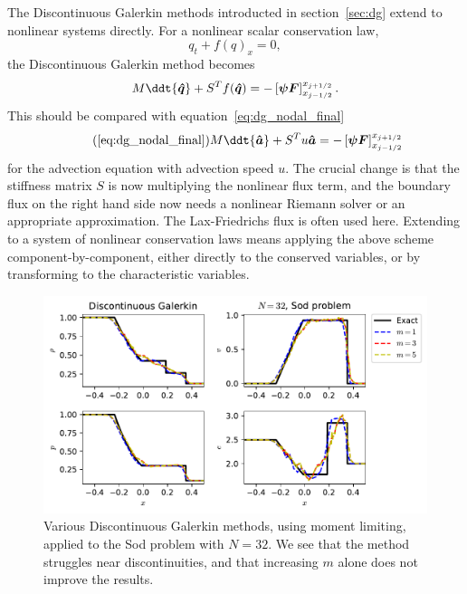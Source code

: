 The Discontinuous Galerkin methods introducted in section~\ref{sec:dg} extend to
nonlinear systems directly. For a nonlinear scalar conservation law,
%
\begin{equation}
  q_t + f(q)_x = 0,
\end{equation}
%
the Discontinuous Galerkin method becomes
%
\begin{equation}
  \label{eq:dg_nodal_scalar_nonlinear}
  M \ddt{\bm{\hat{q}}} + S^T f (\bm{\hat{q}}) = -\left[ \bm{\psi F} \right]_{x_{j-1/2}}^{x_{j+1/2}}.
\end{equation}
%
This should be compared with equation~\eqref{eq:dg_nodal_final}
%
\begin{equation}
  \tag{\ref{eq:dg_nodal_final}}
  M \ddt{\bm{\hat{a}}} + S^T u \bm{\hat{a}} = -\left[ \bm{\psi F} \right]_{x_{j-1/2}}^{x_{j+1/2}}
\end{equation}
%
for the advection equation with advection speed $u$. The crucial change is that
the stiffness matrix $S$ is now multiplying the nonlinear flux term, and the
boundary flux on the right hand side now needs a nonlinear Riemann solver or an
appropriate approximation. The Lax-Friedrichs flux is often used here. Extending
to a system of nonlinear conservation laws means applying the above scheme
component-by-component, either directly to the conserved variables, or by
transforming to the characteristic variables.

\begin{figure}[t]
\centering
\includegraphics[width=0.8\linewidth]{dg_sod_32}
\caption[Discontinuous Galerkin methods applied to the Sod problem, low resolution]
{\label{fig:dg-euler-sod32} Various Discontinuous Galerkin methods, using moment
limiting, applied to the Sod problem with $N=32$. We see that the method
struggles near discontinuities, and that increasing $m$ alone does not improve
the results.\\
}
\end{figure}
%

